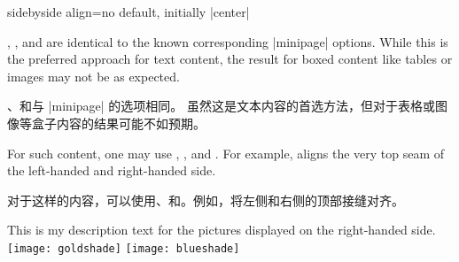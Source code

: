 \begin{docTcbKey}[][doc updated=2015-02-06]{sidebyside align}{=}{no default, initially |center|}


, , and  are identical
to the known corresponding |minipage| options.
While this is the preferred approach for text content, the result for
boxed content like tables or images may not be as expected.

、和与 |minipage| 的选项相同。%
虽然这是文本内容的首选方法，但对于表格或图像等盒子内容的结果可能不如预期。

For such content, one may use , ,
and . For example,  aligns
the very top seam of the left-handed and right-handed side.


对于这样的内容，可以使用、和。例如，将左侧和右侧的顶部接缝对齐。


\begin{dispExample}

\begin{tcolorbox}[adjusted title=center seam,sidebyside align=center seam]
This is my description text for the pictures displayed on the right-handed side.
\tcblower
\texttt{[image: goldshade]}%
\texttt{[image: blueshade]}
\end{tcolorbox}


\end{dispExample}
\end{docTcbKey}
